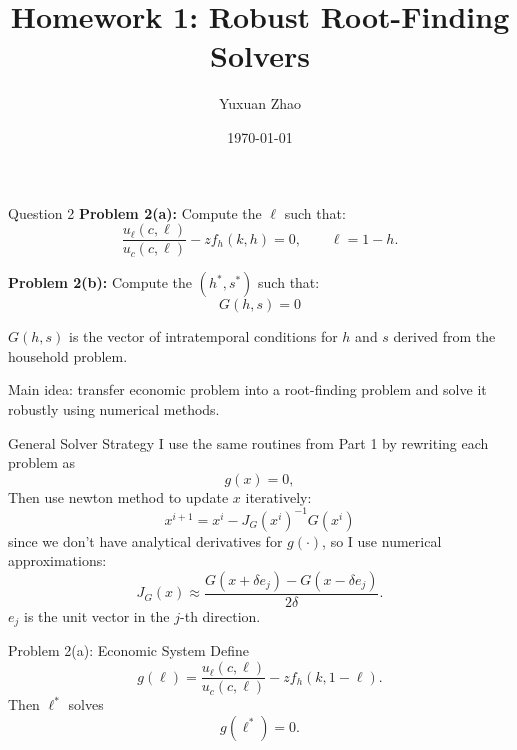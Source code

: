 \documentclass[9pt]{beamer}
\title{Homework 1: Robust Root-Finding Solvers}
\author{Yuxuan Zhao}
\date{\today}
\institute{Department of Economics, University of Minnesota}
\begin{document}
	
	\begin{frame}
		\titlepage
	\end{frame}
	
		


\begin{frame}{Question 2}
\vspace{0.5em}
\textbf{Problem 2(a):} Compute the $\ell$ such that:
\[
\frac{u_{\ell}(c,\ell)}{u_c(c,\ell)} - z f_h(k,h) = 0, \qquad \ell = 1-h.
\]

\vspace{0.5em}
\textbf{Problem 2(b):} Compute the $(h^*, s^*)$ such that:
\[
G(h,s) = 0
\]

$G(h,s)$ is the vector of intratemporal conditions for $h$ and $s$ derived from the household problem.

\vspace{0.5em}
Main idea: transfer economic problem into a root-finding problem and solve it robustly using numerical methods.
\end{frame}

\begin{frame}{General Solver Strategy}
I use the same routines from Part 1 by rewriting each problem as
\[
g(x)=0,
\]
Then use newton method to update $x$ iteratively:
\[
x^{i+1} = x^i - J_G(x^i)^{-1} G(x^i)
\]
since we don't have analytical derivatives for $g(\cdot)$, so I use numerical approximations:
\[
J_G(x) \approx \frac{G(x+\delta e_j) - G(x-\delta e_j)}{2\delta}.
\]
$e_j$ is the unit vector in the $j$-th direction.

\end{frame}

\begin{frame}{Problem 2(a): Economic System}
Define
\[
g(\ell)=\frac{u_{\ell}(c,\ell)}{u_c(c,\ell)}- z f_h(k,1-\ell).
\]
Then $\ell^*$ solves
\[
g(\ell^*)=0.
\]


\end{frame}
\end{document}
